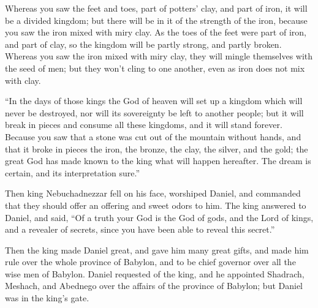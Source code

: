 {Whereas you saw the feet and toes, part of potters’ clay, and part of iron, it will be a divided kingdom; but there will be in it of the strength of the iron, because you saw the iron mixed with miry clay.
As the toes of the feet were part of iron, and part of clay, so the kingdom will be partly strong, and partly broken.
Whereas you saw the iron mixed with miry clay, they will mingle themselves with the seed of men; but they won’t cling to one another, even as iron does not mix with clay.
\par }{\PP {}“In the days of those kings the God of heaven will set up a kingdom which will never be destroyed, nor will its sovereignty be left to another people; but it will break in pieces and consume all these kingdoms, and it will stand forever.
Because you saw that a stone was cut out of the mountain without hands, and that it broke in pieces the iron, the bronze, the clay, the silver, and the gold; the great God has made known to the king what will happen hereafter. The dream is certain, and its interpretation sure.”
\par }{\PP {}Then king Nebuchadnezzar fell on his face, worshiped Daniel, and commanded that they should offer an offering and sweet odors to him.
The king answered to Daniel, and said, “Of a truth your God is the God of gods, and the Lord of kings, and a revealer of secrets, since you have been able to reveal this secret.”
\par }{\PP {}Then the king made Daniel great, and gave him many great gifts, and made him rule over the whole province of Babylon, and to be chief governor over all the wise men of Babylon.
Daniel requested of the king, and he appointed Shadrach, Meshach, and Abednego over the affairs of the province of Babylon; but Daniel was in the king’s gate.

}
